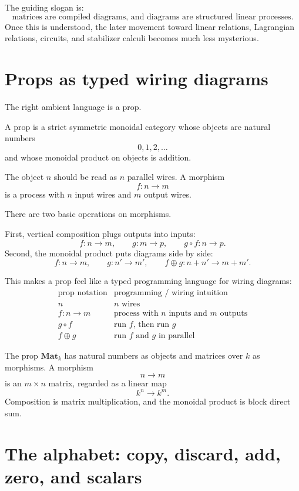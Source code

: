 The guiding slogan is:
\[
  \text{matrices are compiled diagrams, and diagrams are structured linear processes.}
\]
Once this is understood, the later movement toward linear relations, Lagrangian relations, circuits, and stabilizer calculi becomes much less mysterious.

\section{Props as typed wiring diagrams}

The right ambient language is a prop.

\begin{definition}[Prop]
A prop is a strict symmetric monoidal category whose objects are natural numbers
\[
  0,1,2,\ldots
\]
and whose monoidal product on objects is addition.
\end{definition}

The object \(n\) should be read as \(n\) parallel wires.  A morphism
\[
  f:n\to m
\]
is a process with \(n\) input wires and \(m\) output wires.

There are two basic operations on morphisms.

First, vertical composition plugs outputs into inputs:
\[
  f:n\to m,\qquad g:m\to p,\qquad g\circ f:n\to p.
\]
Second, the monoidal product puts diagrams side by side:
\[
  f:n\to m,\qquad g:n'\to m',\qquad f\oplus g:n+n'\to m+m'.
\]

This makes a prop feel like a typed programming language for wiring diagrams:
\[
\begin{array}{c|c}
\text{prop notation} & \text{programming / wiring intuition}\\
\hline
n & n\text{ wires}\\
f:n\to m & \text{process with }n\text{ inputs and }m\text{ outputs}\\
g\circ f & \text{run }f\text{, then run }g\\
f\oplus g & \text{run }f\text{ and }g\text{ in parallel}
\end{array}
\]

The prop \(\mathbf{Mat}_k\) has natural numbers as objects and matrices over \(k\) as morphisms.  A morphism
\[
  n\to m
\]
is an \(m\times n\) matrix, regarded as a linear map
\[
  k^n\to k^m.
\]
Composition is matrix multiplication, and the monoidal product is block direct sum.

\section{The alphabet: copy, discard, add, zero, and scalars}

